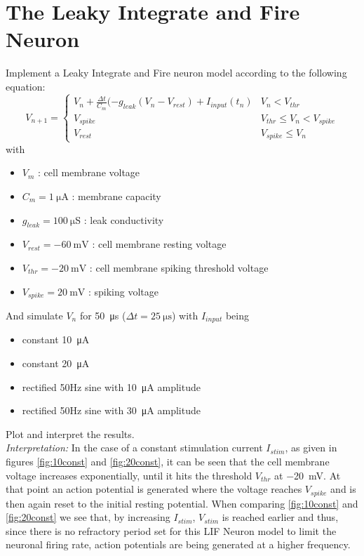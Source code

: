 \documentclass{scrartcl}			%
\begin{document}
\section{The Leaky Integrate and Fire Neuron}
Implement a Leaky Integrate and Fire neuron model according to the following equation:
\begin{equation}
V_{n+1}=\begin{cases}V_n + \frac{\Delta t}{C_m}(-g_{leak}(V_n-V_{rest})+I_{input}(t_n)& V_n < V_{thr}\\V_{spike}&V_{thr} \leq V_n < V_{spike}\\V_{rest}&V_{spike}  \leq V_{n}\end{cases}
\end{equation}
with
\begin{itemize}
\item $V_m$ : cell membrane voltage 
\item $C_m = \SI{1}{\micro\ampere}$ : membrane capacity
\item $g_{leak} = \SI{100}{\micro}$S : leak conductivity
\item $V_{rest} =\SI{-60}{\milli\volt}$ : cell membrane resting voltage
\item $V_{thr} = \SI{-20}{\milli\volt}$ : cell membrane spiking threshold voltage
\item $V_{spike} = \SI{20}{\milli\volt}$ : spiking voltage
\end{itemize}
And simulate $V_n$ for \SI{50}{\micro\second} ($\Delta t = \SI{25}{\micro\second} $) with $I_{input}$ being
\begin{itemize}
\item constant \SI{10}{\micro\ampere}
\item constant \SI{20}{\micro\ampere}
\item rectified 50Hz sine with \SI{10}{\micro\ampere} amplitude
\item rectified 50Hz sine with \SI{30}{\micro\ampere} amplitude
\end{itemize}
Plot and interpret the results.\\
\newline
\textit{Interpretation:}
\newline
In the case of a constant stimulation current $I_{stim}$, as given in figures \ref{fig:10const} and \ref{fig:20const}, it can be seen that the cell membrane voltage increases exponentially, until it hits the threshold $V_{thr}$ at \SI{-20}{\milli\volt}. At that point an action potential is generated where the voltage reaches $V_{spike}$ and is then again reset to the initial resting potential. When comparing \ref{fig:10const} and \ref{fig:20const} we see that, by increasing $I_{stim}$, $V_{stim}$ is reached earlier and thus, since there is no refractory period set for this LIF Neuron model to limit the neuronal firing rate, action potentials are being generated at a higher frequency.
\end{document}

